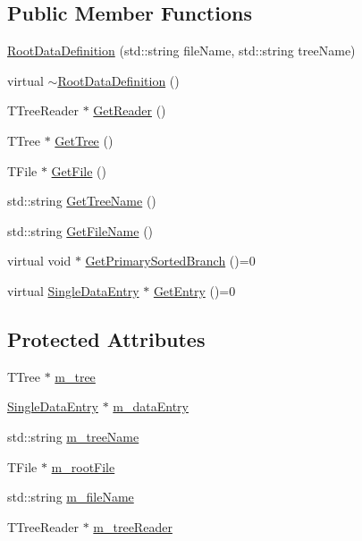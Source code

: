 \subsection*{Public Member Functions}
\begin{DoxyCompactItemize}
\item 
\hyperlink{classRootDataDefinition_aeb304a3a15314058d6663c45c7f8f00e}{Root\+Data\+Definition} (std\+::string file\+Name, std\+::string tree\+Name)
\item 
virtual \hyperlink{classRootDataDefinition_a40a873fba464bcb796a444db890385dc}{$\sim$\+Root\+Data\+Definition} ()
\item 
T\+Tree\+Reader $\ast$ \hyperlink{classRootDataDefinition_a48a885b44c954506728f71f07d927506}{Get\+Reader} ()
\item 
T\+Tree $\ast$ \hyperlink{classRootDataDefinition_a20ed89d6d2483a0f76cd2fb131fcc597}{Get\+Tree} ()
\item 
T\+File $\ast$ \hyperlink{classRootDataDefinition_ab26897ffdd1de5e6572f6067770066b3}{Get\+File} ()
\item 
std\+::string \hyperlink{classRootDataDefinition_acc7728b0a9315cacc6b9c1fae38ed490}{Get\+Tree\+Name} ()
\item 
std\+::string \hyperlink{classRootDataDefinition_a56f206839275fdf5af290b372c4d7e13}{Get\+File\+Name} ()
\item 
virtual void $\ast$ \hyperlink{classRootDataDefinition_a720d0b9c122b778f2b338792de9e8c47}{Get\+Primary\+Sorted\+Branch} ()=0
\item 
virtual \hyperlink{classSingleDataEntry}{Single\+Data\+Entry} $\ast$ \hyperlink{classRootDataDefinition_a60bb9c8884bdaca62fa342bfa6cf0bdb}{Get\+Entry} ()=0
\end{DoxyCompactItemize}
\subsection*{Protected Attributes}
\begin{DoxyCompactItemize}
\item 
T\+Tree $\ast$ \hyperlink{classRootDataDefinition_a941ec585a2aa533bc30889a382e54f50}{m\+\_\+tree}
\item 
\hyperlink{classSingleDataEntry}{Single\+Data\+Entry} $\ast$ \hyperlink{classRootDataDefinition_a4d36dedf6212d7096b0020e9c1be9247}{m\+\_\+data\+Entry}
\item 
std\+::string \hyperlink{classRootDataDefinition_a46394bbb1863baa4abcd8cbd0413fa88}{m\+\_\+tree\+Name}
\item 
T\+File $\ast$ \hyperlink{classRootDataDefinition_af00a892a1b940abf9265066391b67304}{m\+\_\+root\+File}
\item 
std\+::string \hyperlink{classRootDataDefinition_a03154139db8613ec02cd57fd84d8c0e8}{m\+\_\+file\+Name}
\item 
T\+Tree\+Reader $\ast$ \hyperlink{classRootDataDefinition_a919827bdd245e61c0f54676d59cc7448}{m\+\_\+tree\+Reader}
\end{DoxyCompactItemize}


